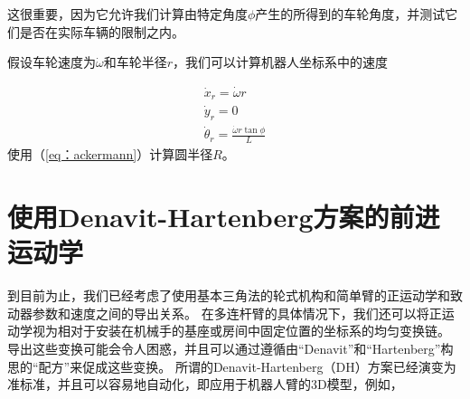 这很重要，因为它允许我们计算由特定角度$ \phi $产生的所得到的车轮角度，并测试它们是否在实际车辆的限制之内。


假设车轮速度为$ \dot {\omega} $和车轮半径$ r $，我们可以计算机器人坐标系中的速度

\begin{eqnarray}
\dot{x}_r=\dot{\omega}r\\
\dot{y}_r=0\\
\dot{\theta}_r=\frac{\dot{\omega}r\tan\phi}{L}
\end{eqnarray}
使用（\ref {eq：ackermann}）计算圆半径$ R $。

\section{使用Denavit-Hartenberg方案的前进运动学}


到目前为止，我们已经考虑了使用基本三角法的轮式机构和简单臂的正运动学和致动器参数和速度之间的导出关系。 在多连杆臂的具体情况下，我们还可以将正运动学视为相对于安装在机械手的基座或房间中固定位置的坐标系的均匀变换链。 导出这些变换可能会令人困惑，并且可以通过遵循由“Denavit”和“Hartenberg”构思的“配方”来促成这些变换。 所谓的Denavit-Hartenberg（DH）方案已经演变为准标准，并且可以容易地自动化，即应用于机器人臂的3D模型，例如，

